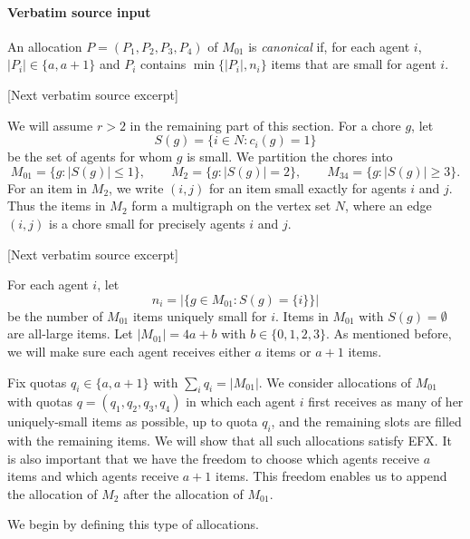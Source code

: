\documentclass[10pt]{article}
\begin{document}
\paragraph{Verbatim source input}
\begin{ReviewVerbatim}
An allocation $P=(P_1,P_2,P_3,P_4)$ of $M_{01}$ is \emph{canonical} if, for each agent $i$, $|P_i|\in\{a,a+1\}$ and $P_i$ contains $\min\{|P_i|, n_i\}$ items that are small for agent $i$.

[Next verbatim source excerpt]

We will assume $r>2$ in the remaining part of this section.
For a chore $g$, let
\[
 S(g)=\{i\in N:c_i(g)=1\}
\]
be the set of agents for whom $g$ is small.  We partition the chores into
\[
M_{01}=\{g:|S(g)|\le 1\},\qquad
M_2=\{g:|S(g)|=2\},\qquad
M_{34}=\{g:|S(g)|\ge 3\}.
\]
For an item in $M_2$, we write $(i,j)$ for an item small exactly for agents
$i$ and $j$.  Thus the items in $M_2$ form a multigraph on the vertex set
$N$, where an edge $(i,j)$ is a chore small for precisely agents $i$ and $j$.

[Next verbatim source excerpt]

For each agent $i$, let
\[
 n_i=\left|\{g\in M_{01}:S(g)=\{i\}\}\right|
\]
be the number of $M_{01}$ items uniquely small for $i$.  Items in $M_{01}$
with $S(g)=\emptyset$ are all-large items.
Let $|M_{01}|=4a+b$ with $b\in\{0,1,2,3\}$.
As mentioned before, we will make sure each agent receives either $a$ items or $a+1$ items.

Fix quotas $q_i\in\{a,a+1\}$ with $\sum_i q_i=|M_{01}|$.
We consider allocations of $M_{01}$ with quotas $q=(q_1,q_2,q_3,q_4)$ in which each agent $i$ first receives as many of her uniquely-small items as possible, up to quota $q_i$, and the remaining slots are filled with the remaining items.
We will show that all such allocations satisfy EFX.
It is also important that we have the freedom to choose which agents receive $a$ items and which agents receive $a+1$ items.
This freedom enables us to append the allocation of $M_2$ after the allocation of $M_{01}$.

We begin by defining this type of allocations.
\end{ReviewVerbatim}
\end{document}
